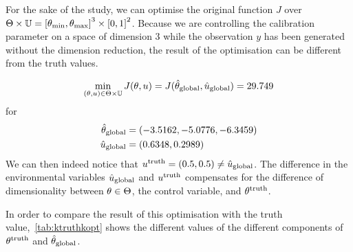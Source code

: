 \documentclass[../../Main_ManuscritThese.tex]{subfiles}
\begin{document}
For the sake of the study, we can optimise the original function $J$
over
$\Kspace\times \Uspace = \interval{\kk_{\min}}{\kk_{\max}}^3 \times
\interval{0}{1}^2$.  Because we are controlling the calibration
parameter on a space of dimension 3 while the observation $y$ has been
generated without the dimension reduction, the result of the
optimisation can be different from the truth values.
 
\begin{equation}
  \min_{(\kk,\uu) \in \Kspace \times \Uspace} J(\kk, \uu) = J(\hat{\kk}_{\mathrm{global}}, \hat{\uu}_{\mathrm{global}})= \num{29.749}
\end{equation}
for
\begin{align}
  \hat{\kk}_{\mathrm{global}}                     & = (\num[round-mode=places,round-precision=4]{-3.5161661} , \num[round-mode=places,round-precision=4]{-5.07764701}, \num[round-mode=places,round-precision=4]{-6.34588442})                                                                                                            \\\hat{\uu}_{\mathrm{global}} & = (\num[round-mode=places,round-precision=4]{0.6347829},\num[round-mode=places,round-precision=4]{0.29890637})
\end{align}
We can then indeed notice that
$\uu^{\mathrm{truth}}=(\num{0.5},\num{0.5}) \neq
\hat{\uu}_{\mathrm{global}}$. The difference in the environmental
variables $\hat{\uu}_{\mathrm{global}}$ and $\uu^{\mathrm{truth}}$
compensates for the difference of dimensionality between
$\kk\in\Kspace$, the control variable, and $\kk^{\mathrm{truth}}$.


In order to compare the result of this optimisation with the truth
value,~\cref{tab:ktruthkopt} shows the different values of the
different components of $\kk^{\mathrm{truth}}$ and
$\hat{\kk}_{\mathrm{global}}$.
\end{document}
